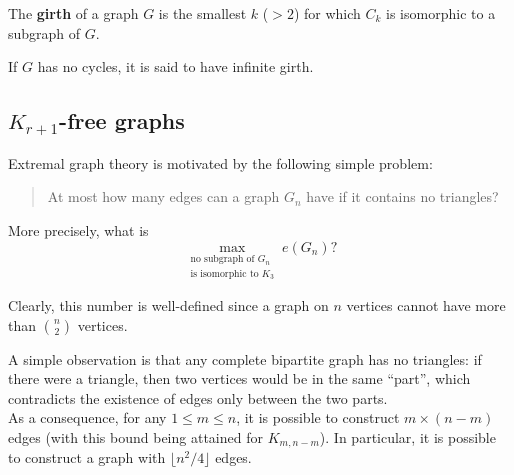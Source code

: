 		\begin{fdef}[Girth]
			The \textbf{girth} of a graph $G$ is the smallest $k$ ($>2$) for which $C_k$ is isomorphic to a subgraph of $G$.
		\end{fdef}

		If $G$ has no cycles, it is said to have infinite girth.

	\subsection{\texorpdfstring{$K_{r+1}$}{K r+1}-free graphs}

		Extremal graph theory is motivated by the following simple problem:

		\begin{quote}
			At most how many edges can a graph $G_n$ have if it contains no triangles?
		\end{quote}

		More precisely, what is
		\[ \max_{\substack{\text{no subgraph of $G_n$} \\ \text{is isomorphic to $K_3$}}} e(G_n)? \]

		Clearly, this number is well-defined since a graph on $n$ vertices cannot have more than $\binom{n}{2}$ vertices.

		A simple observation is that any complete bipartite graph has no triangles: if there were a triangle, then two vertices would be in the same ``part'', which contradicts the existence of edges only between the two parts.\\
		As a consequence, for any $1 \le m \le n$, it is possible to construct $m \times (n-m)$ edges (with this bound being attained for $K_{m,n-m}$). In particular, it is possible to construct a graph with $\lfloor n^2 / 4 \rfloor$ edges.

